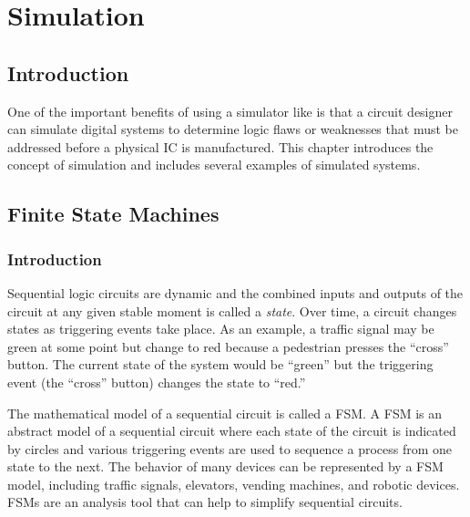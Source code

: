 \chapter{Simulation}\label{ch10}
\section{Introduction}

One of the important benefits of using a simulator like \Le is that a circuit designer can simulate digital systems to determine logic flaws or weaknesses that must be addressed before a physical \ac{IC} is manufactured. This chapter introduces the concept of simulation and includes several examples of simulated systems.

\section{Finite State Machines}
\label{SIM:sec:finite_state_machines}

\subsection{Introduction}
\label{SIM:subsec:intro_to_finite_state_machines}


Sequential logic circuits are dynamic and the combined inputs and outputs of the circuit at any given stable moment is called a \emph{state}. Over time, a circuit changes states as triggering events take place. As an example, a traffic signal may be green at some point but change to red because a pedestrian presses the  ``cross'' button. The current state of the system would be ``green'' but the triggering event (the ``cross'' button) changes the state to ``red.'' 

The mathematical model of a sequential circuit is called a \ac{FSM}. A \acl{FSM} is an abstract model of a sequential circuit where each state of the circuit is indicated by circles and various triggering events are used to sequence a process from one state to the next. The behavior of many devices can be represented by a \acl{FSM} model, including traffic signals, elevators, vending machines, and robotic devices. \aclp{FSM} are an analysis tool that can help to simplify sequential circuits. 

